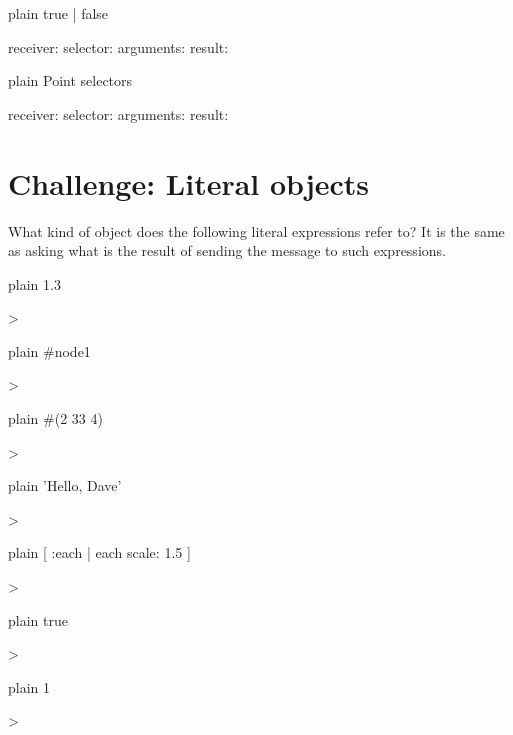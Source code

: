 \documentclass[10pt,twoside,english]{_support/latex/sbabook/sbabook}
\begin{document}
\begin{displaycode}{plain}
true | false

	receiver: 
	selector:
	arguments:
	result:
\end{displaycode}

\begin{displaycode}{plain}
Point selectors

	receiver: 
	selector:
	arguments:
	result:
\end{displaycode}
\section{Challenge: Literal objects}
What kind of object does the following literal expressions refer to? It is the same as asking what is the result of sending the  message to such expressions. 

\begin{displaycode}{plain}
1.3

>
\end{displaycode}

\begin{displaycode}{plain}
#node1

>
\end{displaycode}

\begin{displaycode}{plain}
#(2 33 4)

>
\end{displaycode}

\begin{displaycode}{plain}
'Hello, Dave'

>
\end{displaycode}

\begin{displaycode}{plain}
[ :each | each scale: 1.5 ]

>
\end{displaycode}


\begin{displaycode}{plain}
true

>
\end{displaycode}

\begin{displaycode}{plain}
1

>
\end{displaycode}
\end{document}

